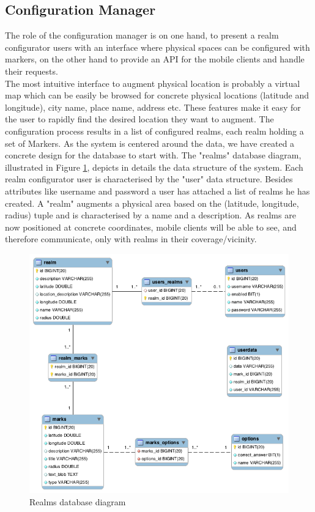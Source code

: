 \subsection{Configuration Manager} %
\label{sub:configuration_manager}
\noindent The role of the configuration manager is on one hand, to present a realm configurator users with an interface where physical spaces can be configured with markers, on the other hand to provide an API for the mobile clients and handle their requests.
\\

\noindent The most intuitive interface to augment physical location is probably a virtual map which can be easily be browsed for concrete physical locations (latitude and longitude), city name, place name, address etc. These features make it easy for the user to rapidly find the desired location they want to augment. The configuration process results in a list of configured realms, each realm holding a set of Markers. As the system is centered around the data, we have created a concrete design for the database to start with. The  "realms" database diagram, illustrated in Figure \ref{fig.db_structure}, depicts in details the data structure of the system. Each realm configurator user is characterised by the "user" data structure. Besides attributes like username and password a user has attached a list of realms he has created. A "realm" augments a physical area based on the (latitude, longitude, radius) tuple and is characterised by a name and a description. As realms are now positioned at concrete coordinates, mobile clients will be able to see, and therefore communicate, only with realms in their coverage/vicinity.
\begin{figure}[H]
	\centering
	\includegraphics[width=1.0\linewidth]{fig/db_structure}
	\caption{Realms database diagram}
	\label{fig.db_structure}
\end{figure}
